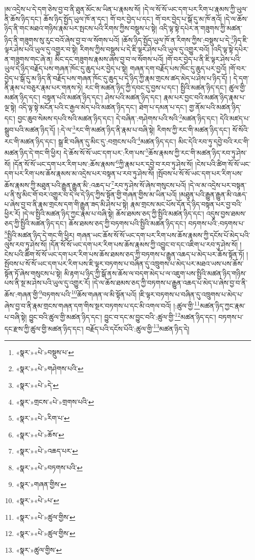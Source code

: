 །མ་འདྲེས་པ་དེ་དག་ཅེས་བྱ་བ་ནི་ཐུན་མོང་མ་ཡིན་པ་རྣམས་སོ། །དེ་ལ་སོ་སོ་ཡང་དག་པར་རིག་པ་རྣམས་ཀྱི་ཡུལ་ནི་ཆོས་ཉིད་དང་། ཆོས་ཉིད་སྤྱོད་ཡུལ་ཁོ་ན་དང་། གོ་བར་བྱེད་པ་དང་། གོ་བར་བྱེད་པ་སྒོ་དུ་མ་ཁོ་ནའོ། །དེ་ལ་ཆོས་ཉིད་ནི་གང་མཐའ་གཉིས་རྣམ་པར་སྤངས་པའི་རིགས་ཀྱིས་བསྡུས་པ་སྟེ། འདི་ལྟ་སྟེ་དཔེར་ན་གཟུགས་ཀྱི་མཚན་ཉིད་ནི་གཟུགས་སུ་རུང་བའོ་ཞེས་བྱ་བ་ལ་སོགས་པའོ། །ཆོས་ཉིད་སྤྱོད་ཡུལ་ཁོ་ན་རིགས་ཀྱིས་:བསྡུས་པ་དེ་\footnote{«སྣར་»«པེ་»བསྡུས་པ་}ཉིད་ཇི་ལྟར་ཤེས་པའི་ཡུལ་དུ་འགྱུར་བ་སྟེ། རིགས་ཀྱིས་བསྡུས་པ་དེ་ཇི་ལྟར་ཤེས་པའི་ཡུལ་དུ་འགྱུར་བའོ། །འདི་ལྟ་སྟེ་དཔེར་ན་གཟུགས་གང་ཞེ་ན། མིང་དང་གཟུགས་རྣམས་ཞེས་བྱ་བ་ལ་སོགས་པའོ། །གོ་བར་བྱེད་པ་ནི་ཇི་ལྟར་ཤེས་པའི་ཡུལ་དེ་ཉིད་བརྗོད་པས་གཞན་ཁོང་དུ་ཆུད་པར་བྱེད་པ་སྟེ། གཞན་དག་བརྗོད་པས་ཁོང་དུ་ཆུད་པར་བྱའོ། །གོ་བར་བྱེད་པ་སྒོ་དུ་མ་ཉིད་ནི་བརྗོད་པས་གཞན་ཁོང་དུ་ཆུད་པ་དེ་ཉིད་ཀྱི་རྣམ་གྲངས་ཚད་མེད་པ་ཤེས་པ་ཉིད་དོ། །
དེ་དག་ནི་རྣམ་པ་བཅུར་རྣམ་པར་གནས་ཏེ། རང་གི་མཚན་ཉིད་ཀྱི་དབང་དུ་བྱས་པ་དང་། སྤྱིའི་མཚན་ཉིད་དང་། ཚུལ་གྱི་མཚན་ཉིད་དང་། བསྟན་པའི་མཚན་ཉིད་དང་། ཤེས་པའི་མཚན་ཉིད་དང་། རྣམ་པར་བྱང་བའི་མཚན་ཉིད་རྣམ་པ་ལྔ་སྟེ། འདི་ལྟ་སྟེ་མངོན་པའི་ང་རྒྱལ་མེད་པའི་མཚན་ཉིད་དང་། ཐེག་པ་དམན་པ་དང་། གྱ་ནོམ་པའི་མཚན་ཉིད་དང་། བྱང་ཆུབ་སེམས་དཔའི་སའི་མཚན་ཉིད་དང་། དེ་བཞིན་:གཤེགས་པའི་སའི་\footnote{«སྣར་»«པེ་»གཤེགས་པའི་}མཚན་ཉིད་དང་། དེའི་མཛད་པ་སྒྲུབ་པའི་མཚན་ཉིད་དོ། །:དེ་ལ་\footnote{«སྣར་»«པེ་»དེ་}རང་གི་མཚན་ཉིད་ནི་རྣམ་པ་བཞི་སྟེ། རིགས་ཀྱི་རང་གི་མཚན་ཉིད་དང་། སོ་སོའི་རང་གི་མཚན་ཉིད་དང་། སྒྲ་ཇི་བཞིན་དུ་མིང་དུ་:བགྲངས་པའི་\footnote{«སྣར་»གྲངས་«པེ་»གྲགས་པའི་}མཚན་ཉིད་དང་། མིང་དེའི་རབ་ཏུ་དབྱེ་བའི་རང་གི་མཚན་ཉིད་དེ་གང་གི་ཕྱིར། དེ་ཆོས་སོ་སོ་ཡང་དག་པར་:རིག་པས་\footnote{«སྣར་»«པེ་»རིག་པ་}ཆོས་རྣམས་ཀྱི་རང་གི་མཚན་ཉིད་རབ་ཏུ་ཤེས་སོ། །དོན་སོ་སོ་ཡང་དག་པར་རིག་པས་:ཆོས་རྣམས་\footnote{«སྣར་»«པེ་»ཆོས་}ཀྱི་རྣམ་པར་དབྱེ་བ་རབ་ཏུ་ཤེས་སོ། །ངེས་པའི་ཚིག་སོ་སོ་ཡང་དག་པར་རིག་པས་ཆོས་རྣམས་མ་འདྲེས་པར་བསྟན་པ་རབ་ཏུ་ཤེས་སོ། །སྤོབས་པ་སོ་སོ་ཡང་དག་པར་རིག་པས་ཆོས་རྣམས་ཀྱི་མཐུན་པའི་རྒྱུན་རྒྱུན་མི་:འཆད་པ་\footnote{«སྣར་»«པེ་»འཆད་པར་}རབ་ཏུ་ཤེས་སོ་ཞེས་གསུངས་པའོ། །དེ་ལ་མ་འདྲེས་པར་བསྟན་པ་ནི་སུ་མིང་གོ་བར་འགྱུར་བ་དེ་ལ་དེ་ཉིད་ཀྱིས་སྟོན་གྱི་གཞན་གྱིས་མ་ཡིན་པའོ། །མཐུན་པའི་རྒྱུན་རྒྱུན་མི་འཆད་པ་ཞེས་བྱ་བ་ནི་རྣམ་གྲངས་དག་གི་རྒྱུན་ཟད་མི་ཤེས་པ་སྟེ། རྣམ་གྲངས་མང་པོས་དོན་དེ་ཉིད་བསྟན་པར་བྱ་བའི་ཕྱིར་རོ། །དེ་ལ་སྤྱིའི་མཚན་ཉིད་ཀྱང་རྣམ་པ་བཞི་སྟེ། ཆོས་ཐམས་ཅད་ཀྱི་སྤྱིའི་མཚན་ཉིད་དང་། འདུས་བྱས་ཐམས་ཅད་ཀྱི་སྤྱིའི་མཚན་ཉིད་དང་། ཆོས་ཐམས་ཅད་ཀྱི་བཏགས་པའི་སྤྱིའི་མཚན་ཉིད་དང་། བཏགས་པའི་:བཏགས་པ་\footnote{«སྣར་»«པེ་»བཏགས་པའི་}སྤྱིའི་མཚན་ཉིད་དེ་གང་གི་ཕྱིར། གཞན་ཡང་ཆོས་སོ་སོ་ཡང་དག་པར་རིག་པས་ཆོས་རྣམས་ཀྱི་དངོས་པོ་མེད་པའི་ལུས་རབ་ཏུ་ཤེས་སོ། །དོན་སོ་སོ་ཡང་དག་པར་རིག་པས་ཆོས་རྣམས་ཀྱི་འབྱུང་བ་དང་འཇིག་པ་རབ་ཏུ་ཤེས་སོ། །ངེས་པའི་ཚིག་སོ་སོ་ཡང་དག་པར་རིག་པས་ཆོས་ཐམས་ཅད་ཀྱི་བཏགས་པ་རྒྱུན་འཆད་པ་མེད་པར་ཆོས་སྟོན་ཏོ། །སྤོབས་པ་སོ་སོ་ཡང་དག་པར་རིག་པས་ཇི་ལྟར་བཏགས་པ་བཞིན་དུ་འཁྲུགས་པ་མེད་པར་མཐའ་ཡས་པས་ཆོས་སྟོན་ཏོ་ཞེས་གསུངས་པ་སྟེ། མི་རྟག་པ་ཉིད་ཀྱི་སྒོ་ནས་ཆོས་ལ་བདག་མེད་པ་ལ་འཇུག་པས་སྤྱིའི་མཚན་ཉིད་གཉིས་པས་ནི་སྔ་མ་ཤེས་པའི་ཡུལ་དུ་འགྱུར་རོ། །དེ་ལ་ཆོས་ཐམས་ཅད་ཀྱི་བཏགས་པ་རྒྱུན་འཆད་པ་མེད་པ་ཞེས་བྱ་བ་ནི་ཆོས་:གཞན་གྱི་\footnote{«སྣར་»གཞན་གྱིས་}བཏགས་པའི་\footnote{«སྣར་»«པེ་»པ་}ཆོས་གཞན་ལ་མི་སྟོན་པའོ། །ཇི་ལྟར་བཏགས་པ་བཞིན་དུ་འཁྲུགས་པ་མེད་པ་ཞེས་བྱ་བ་ནི་རྣམ་གྲངས་གཞན་དག་གིས་སྔར་བཏགས་པ་དང་མི་འགལ་བའོ། །:ཚུལ་གྱི་\footnote{«སྣར་»«པེ་»ཚུལ་གྱིས་}མཚན་ཉིད་ཀྱང་རྣམ་པ་བཞི་སྟེ། བྱུང་བའི་ཚུལ་གྱི་མཚན་ཉིད་དང་། བྱུང་བ་དང་མ་བྱུང་བའི་:ཚུལ་གྱི་\footnote{«སྣར་»«པེ་»ཚུལ་གྱིས་}མཚན་ཉིད་དང་། བཏགས་པ་དང་རྫས་ཀྱི་ཚུལ་གྱི་མཚན་ཉིད་དང་། བརྗོད་པའི་དངོས་པོའི་:ཚུལ་གྱི་\footnote{«སྣར་»ཚུལ་གྱིས་}མཚན་ཉིད་དེ། 